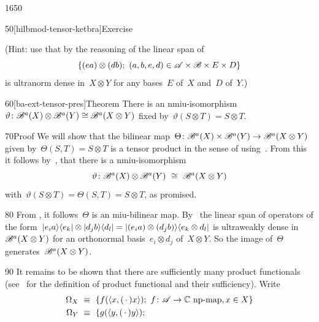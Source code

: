 \begin{parsec}{1650}
\begin{point}{50}[hilbmod-tensor-ketbra]{Exercise}
\begin{enumerate}
    (Hint:
    use that by the reasoning of 
    the linear
    span of
    \begin{equation*}
    \{ (e a) \otimes (d b); \ (a,b,e,d) \in \mathscr{A} \times \mathscr{B}
                    \times E \times D\}
    \end{equation*}
        is ultranorm dense in~$X \otimes Y$
        for any bases~$E$ of~$X$ and~$D$ of~$Y$.)

\end{enumerate}
\spacingfix{}
\end{point}
\begin{point}{60}[ba-ext-tensor-pres]{Theorem}%
There is an
    nmiu-isomorphism~$\vartheta\colon \mathscr{B}^a(X) \otimes \mathscr{B}^a(Y) \cong \mathscr{B}^a(X \otimes Y)$
    fixed by~$\vartheta(S\otimes T) = S \otimes T$.
\begin{point}{70}{Proof}%
We will show that
    the bilinear map~$\Theta \colon 
            \mathscr{B}^a(X) \times \mathscr{B}^a(Y) \to
    \mathscr{B}^a(X \otimes Y)$
    given by~$\Theta(S,T) = S \otimes T$
    is a tensor product in the sense of 
    using~.
From this it follows
    by~,
    that there is a
    nmiu-isomorphism
    \begin{equation*}
    \vartheta\colon \scrB^a(X) \otimes \scrB^a(Y) \ \cong\  \scrB^a(X \otimes Y)
    \end{equation*}
    with~$\vartheta(S\otimes T) = \Theta(S , T) = S \otimes T$, as promised.
\begin{point}{80}%
From , it follows~$\Theta$ is an miu-bilinear map.
By~
    the linear span of operators of the form~$
        \left|e_i a\right>\!\left<e_k\right| \otimes \left|d_j b \right>\!\left<d_l\right|
        = \left|(e_i a) \otimes (d_j b)\right>\!\left<e_k \otimes d_l\right| $
        is ultraweakly dense in~$\mathscr{B}^a(X \otimes Y)$
        for an orthonormal basis~$e_i \otimes d_j$ of~$X \otimes Y$.
        So the image of~$\Theta$ generates~$\mathscr{B}^a(X\otimes Y)$.
\begin{point}{90}%
    It remains to be shown that there are sufficiently many product functionals
    (see~ for the definition of product functional
    and their sufficiency).
    Write
    \begin{align*}
        \Omega_X &\ \equiv \ 
                    \{ f(\langle x, (\,\cdot\,) x \rangle);
                    \ f \colon \scrA \to \C \text{ np-map}, x\in X \} \\
        \Omega_Y& \  \equiv\ 
                    \{ g(\langle y, (\,\cdot\,) y \rangle);

\end{align*}
\end{point}
\end{point}
\end{point}
\end{point}
\end{parsec}
